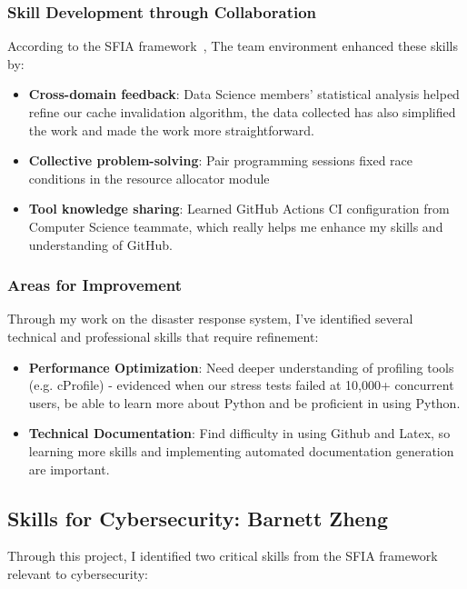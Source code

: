 \documentclass[a4paper, 11pt]{report}
\begin{document}
\subsubsection{Skill Development through Collaboration}
According to the SFIA framework~\cite{sfia}, The team environment enhanced these skills by:
\begin{itemize}
    \item \textbf{Cross-domain feedback}: Data Science members' statistical analysis helped refine our cache invalidation algorithm, the data collected has also simplified the work and made the work more straightforward.
    \item \textbf{Collective problem-solving}: Pair programming sessions fixed race conditions in the resource allocator module
    \item \textbf{Tool knowledge sharing}: Learned GitHub Actions CI configuration from Computer Science teammate, which really helps me enhance my skills and understanding of GitHub.
\end{itemize}

\subsubsection{Areas for Improvement}  
Through my work on the disaster response system, I've identified several technical and professional skills that require refinement:
\begin{itemize}
    \item \textbf{Performance Optimization}: Need deeper understanding of profiling tools (e.g. cProfile) - evidenced when our stress tests failed at 10,000+ concurrent users, be able to learn more about Python and be proficient in using Python. 
    \item \textbf{Technical Documentation}: Find difficulty in using Github and Latex, so learning more skills and implementing automated documentation generation are important.
\end{itemize}   

\subsection{Skills for Cybersecurity: Barnett Zheng}
Through this project, I identified two critical skills from the SFIA framework relevant to cybersecurity:
\end{document}
